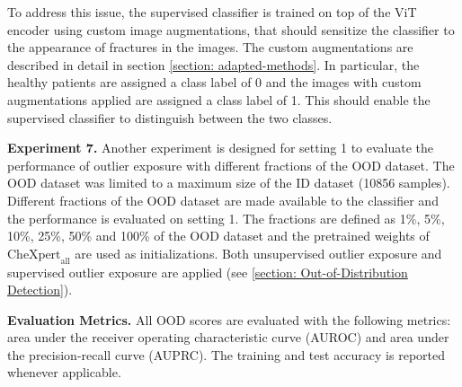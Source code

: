 To address this issue, the supervised classifier is trained on top of the ViT encoder using custom image augmentations, that should sensitize the classifier to the appearance of fractures in the images.
The custom augmentations are described in detail in section \ref{section: adapted-methods}.
In particular, the healthy patients are assigned a class label of 0 and the images with custom augmentations applied are assigned a class label of 1.
This should enable the supervised classifier to distinguish between the two classes.
\par
\textbf{Experiment 7.}
Another experiment is designed for setting 1 to evaluate the performance of outlier exposure with different fractions of the OOD dataset.
The OOD dataset was limited to a maximum size of the ID dataset (10856 samples).
Different fractions of the OOD dataset are made available to the classifier and the performance is evaluated on setting 1.
The fractions are defined as 1\%, 5\%, 10\%, 25\%, 50\% and 100\% of the OOD dataset and the pretrained weights of $\text{CheXpert}_\text{all}$ are used as initializations.
Both unsupervised outlier exposure and supervised outlier exposure are applied (see \ref{section: Out-of-Distribution Detection}).
\par
\textbf{Evaluation Metrics.}
All OOD scores are evaluated with the following metrics: area under the receiver operating characteristic curve (AUROC) and area under the precision-recall curve (AUPRC).
The training and test accuracy is reported whenever applicable.